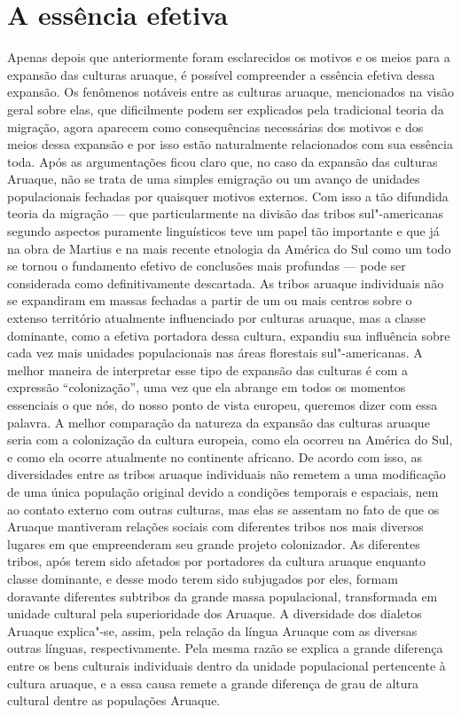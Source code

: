 \chapter*{A essência efetiva\smallskip{}}

Apenas depois que anteriormente foram esclarecidos os motivos e os meios
para a expansão das culturas aruaque, é possível compreender a essência
efetiva dessa expansão. Os fenômenos notáveis entre as culturas aruaque,
mencionados na visão geral sobre elas, que dificilmente podem ser
explicados pela tradicional teoria da migração, agora aparecem como
consequências necessárias dos motivos e dos meios dessa expansão e por
isso estão naturalmente relacionados com sua essência toda. Após as
argumentações ficou claro que, no caso da expansão das culturas
Aruaque, não se trata de uma simples emigração ou um avanço de unidades
populacionais fechadas por quaisquer motivos externos. Com isso a tão
difundida teoria da migração --- que particularmente na divisão das
tribos sul"-americanas segundo aspectos puramente linguísticos teve um
papel tão importante e que já na obra de Martius e na mais recente
etnologia da América do Sul como um todo se tornou o fundamento efetivo
de conclusões mais profundas --- pode ser considerada como
definitivamente descartada. As tribos aruaque individuais não se
expandiram em massas fechadas a partir de um ou mais centros sobre o
extenso território atualmente influenciado por culturas aruaque, mas a
classe dominante, como a efetiva portadora dessa cultura, expandiu sua
influência sobre cada vez mais unidades populacionais nas áreas
florestais sul"-americanas. A melhor maneira de interpretar esse tipo de
expansão das culturas é com a expressão ``colonização'', uma vez que
ela abrange em todos os momentos essenciais o que nós, do nosso ponto de
vista europeu, queremos dizer com essa palavra. A melhor comparação da
natureza da expansão das culturas aruaque seria com a colonização da
cultura europeia, como ela ocorreu na América do Sul, e como ela ocorre
atualmente no continente africano. De acordo com isso, as diversidades
entre as tribos aruaque individuais não remetem a uma modificação de uma
única população original devido a condições temporais e espaciais, nem
ao contato externo com outras culturas, mas elas se assentam no fato de
que os Aruaque mantiveram relações sociais com diferentes tribos nos
mais diversos lugares em que empreenderam seu grande projeto
colonizador. As diferentes tribos, após terem sido afetados por
portadores da cultura aruaque enquanto classe dominante, e desse modo
terem sido subjugados por eles, formam doravante diferentes subtribos da
grande massa populacional, transformada em unidade cultural pela
superioridade dos Aruaque. A diversidade dos dialetos Aruaque
explica"-se, assim, pela relação da língua Aruaque com as diversas outras
línguas, respectivamente. Pela mesma razão se explica a grande diferença
entre os bens culturais individuais dentro da unidade populacional
pertencente à cultura aruaque, e a essa causa remete a grande diferença
de grau de altura cultural dentre as populações Aruaque.

